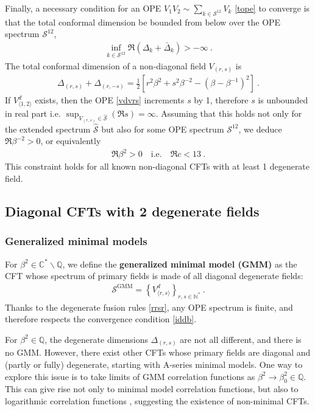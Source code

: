\documentclass[12pt, a4paper]{article}
\newcommand{\myindex}[1]{\textbf{\boldmath #1}}
\begin{document}
Finally, a necessary condition for an OPE $V_1V_2\sim \sum_{k\in\mathcal{S}^{12}}V_k$ \eqref{tope} to converge is that the total conformal dimension be bounded from below over the OPE spectrum $\mathcal{S}^{12}$,
\begin{align}
 \boxed{\inf_{k\in \mathcal{S}^{12}}\Re\left(\Delta_k+\bar\Delta_k\right) > -\infty} \ . 
 \label{iddb}
\end{align}
The total conformal dimension of a non-diagonal field $V_{(r,s)}$ is 
\begin{align}
 \Delta_{(r,s)}+\Delta_{(r,-s)} = \frac12\left[ r^2\beta^{2} + s^2\beta^{-2}  -\left(\beta-\beta^{-1}\right)^2\right]\ .
\end{align}
If $V^d_{\langle 1,2\rangle}$ exists, then the OPE \eqref{vdvrs} increments $s$ by 1, therefore $s$ is unbounded in real part i.e. $\sup_{V_{(r,s)}\in \widehat{\mathcal{S}}} \left(\Re s\right) = \infty$. Assuming that this holds not only for the extended spectrum $\widehat{\mathcal{S}}$ but also for some OPE spectrum $\mathcal{S}^{12}$, we deduce $\Re\beta^{-2}>0$, or equivalently 
\begin{align}
 \boxed{\Re\beta^2 > 0 \quad \text{i.e.} \quad \Re c < 13}\ .
 \label{rbp}
\end{align}
This constraint holds for all known non-diagonal CFTs with at least 1 degenerate field. 

\subsection{Diagonal CFTs with 2 degenerate fields}\label{sec:diag}

\subsubsection{Generalized minimal models}\label{sec:gmm}

For $\beta^2\in\mathbb{C}^*\backslash\mathbb{Q}$, we define the \myindex{generalized minimal model (GMM)} as the CFT whose spectrum of primary fields is made of all diagonal degenerate fields:
\begin{align}
 \boxed{\mathcal{S}^\text{GMM} = \left\{ V^d_{\langle r,s\rangle}\right\}_{r,s\in\mathbb{N}^*}} \ . 
\end{align}
Thanks to the degenerate fusion rules \eqref{rrsr}, any OPE spectrum is finite, and therefore respects the convergence condition \eqref{iddb}.

For $\beta^2\in \mathbb{Q}$, the degenerate dimensions $\Delta_{(r,s)}$ are not all different, and there is no GMM. However, there exist other CFTs whose primary fields are diagonal and (partly or fully) degenerate, starting with A-series minimal models. One way to explore this issue is to take limits of GMM correlation functions as $\beta^2\to \beta^2_0\in \mathbb{Q}$. This can give rise not only to minimal model correlation functions, but also to logarithmic correlation functions \cite{rib18}, suggesting the existence of non-minimal CFTs. 
\end{document}
